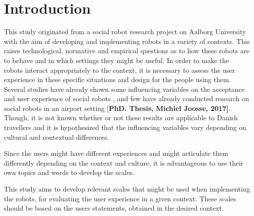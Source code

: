 \section{Introduction}
\label{Introduction}

This study originated from a social robot research project on Aalborg University with the aim of developing and implementing robots in a variety of contexts. This raises technological, normative and empirical questions as to how these robots are to behave and in which settings they might be useful. 
In order to make the robots interact appropriately to the context, it is necessary to assess the user experience in these specific situations and design for the people using them.
Several studies have already shown some influencing variables on the acceptance and user experience of social robots \cite{Graaf2013}  \cite{Graaf2015}, and few have already conducted research on social robots in an airport setting [\textbf{PhD. Thesis, Michiel Joosse, 2017]}. Though, it is not known whether or not these results are applicable to Danish travellers and it is hypothesized that the influencing variables vary depending on cultural and contextual differences.

Since the users might have different experiences and might articulate them differently depending on the context and culture, it is advantageous to use their own topics and words to develop the scales.

This study aims to develop relevant scales that might be used when implementing the robots, for evaluating the user experience in a given context. These scales should be based on the users statements, obtained in the desired context.








